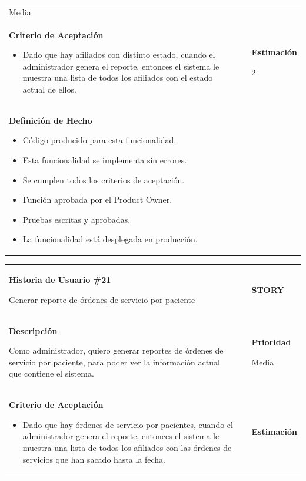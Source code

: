 \documentclass[12pt,a4paper]{article}
\begin{document}
\begin{center}
\begin{tabular}{| p{10cm} c p{2.5cm}|}
Media\\

\textbf{Criterio de Aceptación}

\begin{itemize}
\item Dado que hay afiliados con distinto estado, cuando el
administrador genera el reporte, entonces el sistema le muestra
una lista de todos los afiliados con el estado actual de ellos.
\end{itemize} & & \textbf{Estimación}

2 \\ 

\textbf{Definición de Hecho}

\begin{itemize}
\item Código producido para esta funcionalidad.
\item Esta funcionalidad se implementa sin errores.
\item Se cumplen todos los criterios de aceptación.
\item Función aprobada por el Product Owner.
\item Pruebas escritas y aprobadas.
\item La funcionalidad está desplegada en producción.
\end{itemize} & & \\
\hline 
\end{tabular}
\vspace{5mm}

\begin{tabular}{| p{10cm} c p{2.5cm}|}
\hline 
\textbf{Historia de Usuario \#21}

Generar reporte de órdenes de servicio por paciente & & \textbf{{\Large STORY}} \\ 
\textbf{Descripción}

Como administrador, quiero generar reportes de órdenes de servicio por
paciente, para poder ver la información actual que contiene el sistema. &  & \textbf{Prioridad}

Media\\

\textbf{Criterio de Aceptación}

\begin{itemize}
\item Dado que hay órdenes de servicio por pacientes, cuando el
administrador genera el reporte, entonces el sistema le muestra
una lista de todos los afiliados con las órdenes de servicios que
han sacado hasta la fecha.
\end{itemize} & & \textbf{Estimación}


\end{tabular}
\end{center}
\end{document}
